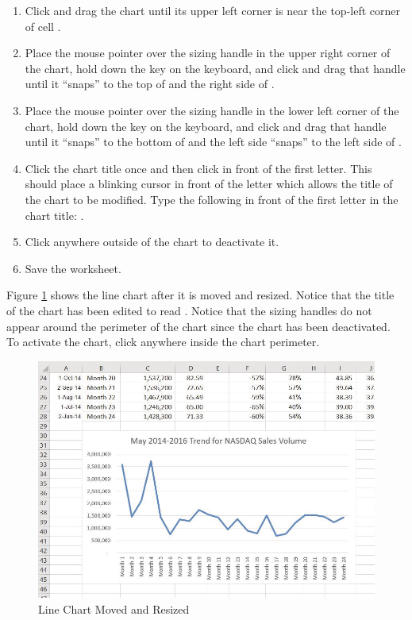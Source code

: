 \begin{enumerate}
	\item Click and drag the chart until its upper left corner is near the top-left corner of cell .
	\item Place the mouse pointer over the sizing handle in the upper right corner of the chart, hold down the  key on the keyboard, and click and drag that handle until it ``snaps'' to the top of  and the right side of .
	\item Place the mouse pointer over the sizing handle in the lower left corner of the chart, hold down the  key on the keyboard, and click and drag that handle until it ``snaps'' to the bottom of  and the left side ``snaps'' to the left side of .
	\item Click the chart title once and then click in front of the first letter. This should place a blinking cursor in front of the letter which allows the title of the chart to be modified. Type the following in front of the first letter in the chart title: .
	\item Click anywhere outside of the chart to deactivate it.
	\item Save the worksheet.
\end{enumerate}

Figure \ref{04:fig04} shows the line chart after it is moved and resized. Notice that the title of the chart has been edited to read . Notice that the sizing handles do not appear around the perimeter of the chart since the chart has been deactivated. To activate the chart, click anywhere inside the chart perimeter.

\begin{figure}[H]
	\centering
	\includegraphics[width=\maxwidth{.95\linewidth}]{gfx/ch04_fig04}
	\caption{Line Chart Moved and Resized}
	\label{04:fig04}
\end{figure}


